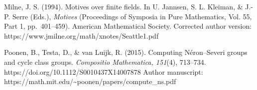 Milne, J. S. (1994). Motives over finite fields. In U. Jannsen, S. L.
Kleiman, \& J.-P. Serre (Eds.), \emph{Motives} (Proceedings of Symposia
in Pure Mathematics, Vol. 55, Part 1, pp.~401--459). American
Mathematical Society. Corrected author version:
https://www.jmilne.org/math/xnotes/Seattle1.pdf

Poonen, B., Testa, D., \& van Luijk, R. (2015). Computing Néron--Severi
groups and cycle class groups. \emph{Compositio Mathematica, 151}(4),
713--734. https://doi.org/10.1112/S0010437X14007878 Author manuscript:
https://math.mit.edu/\textasciitilde poonen/papers/compute\_ns.pdf
